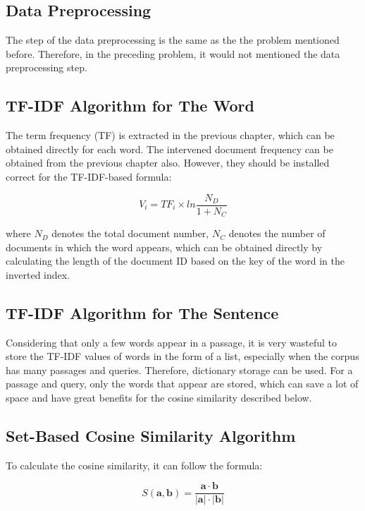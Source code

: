 \documentclass[11pt]{article}
\begin{document}
\subsection{Data Preprocessing}

The step of the data preprocessing is the same as the the problem mentioned before. Therefore, in the preceding problem, it would not mentioned the data preprocessing step.

\subsection{TF-IDF Algorithm for The Word}

The term frequency (TF) is extracted in the previous chapter, which can be obtained directly for each word. The intervened document frequency can be obtained from the previous chapter also. However, they should be installed correct for the TF-IDF-based formula:

\begin{equation}
V_i = TF_i\times ln\frac{N_D}{1 + N_C}
\end{equation}

where $N_D$ denotes the total document number, $N_C$ denotes the number of documents in which the word appears, which can be obtained directly by calculating the length of the document ID based on the key of the word in the inverted index.

\subsection{TF-IDF Algorithm for The Sentence}

Considering that only a few words appear in a passage, it is very wasteful to store the TF-IDF values of words in the form of a list, especially when the corpus has many passages and queries. Therefore, dictionary storage can be used. For a passage and query, only the words that appear are stored, which can save a lot of space and have great benefits for the cosine similarity described below.

\subsection{Set-Based Cosine Similarity Algorithm}

To calculate the cosine similarity, it can follow the formula:

\begin{equation}
S(\mathbf{a},\mathbf{b}) = \frac{\mathbf{a}\cdot\mathbf{b}}{|\mathbf{a}|\cdot |\mathbf{b}|}
\end{equation}
\end{document}
